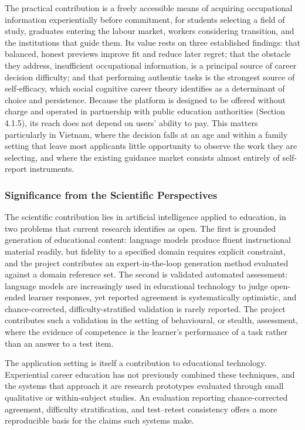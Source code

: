 The practical contribution is a freely accessible means of acquiring occupational information experientially before commitment, for students selecting a field of study, graduates entering the labour market, workers considering transition, and the institutions that guide them. Its value rests on three established findings: that balanced, honest previews improve fit and reduce later regret\cite{r8,r9}; that the obstacle they address, insufficient occupational information, is a principal source of career decision difficulty\cite{r1,r2}; and that performing authentic tasks is the strongest source of self-efficacy, which social cognitive career theory identifies as a determinant of choice and persistence\cite{r10,r11}. Because the platform is designed to be offered without charge and operated in partnership with public education authorities (Section 4.1.5), its reach does not depend on users' ability to pay. This matters particularly in Vietnam, where the decision falls at an age and within a family setting that leave most applicants little opportunity to observe the work they are selecting, and where the existing guidance market consists almost entirely of self-report instruments.

\subsubsection{Significance from the Scientific Perspectives}

The scientific contribution lies in artificial intelligence applied to education, in two problems that current research identifies as open. The first is grounded generation of educational content: language models produce fluent instructional material readily, but fidelity to a specified domain requires explicit constraint, and the project contributes an expert-in-the-loop generation method evaluated against a domain reference set. The second is validated automated assessment: language models are increasingly used in educational technology to judge open-ended learner responses, yet reported agreement is systematically optimistic, and chance-corrected, difficulty-stratified validation is rarely reported. The project contributes such a validation in the setting of behavioural, or stealth, assessment, where the evidence of competence is the learner's performance of a task rather than an answer to a test item.

The application setting is itself a contribution to educational technology. Experiential career education has not previously combined these techniques, and the systems that approach it are research prototypes evaluated through small qualitative or within-subject studies. An evaluation reporting chance-corrected agreement, difficulty stratification, and test--retest consistency offers a more reproducible basis for the claims such systems make.

